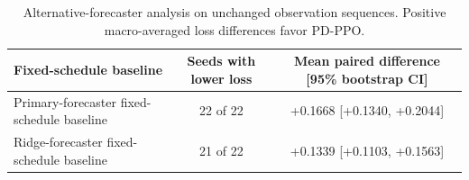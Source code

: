 \begin{table}[htbp]
  \centering
  \caption{Alternative-forecaster analysis on unchanged observation sequences. Positive macro-averaged loss differences favor PD-PPO.}
  \label{tab:clean_secondary_forecaster}
  \footnotesize
  \begin{tabular}{@{}lcc@{}}
    \toprule
    Fixed-schedule baseline & Seeds with lower loss & Mean paired difference [95\% bootstrap CI] \\
    \midrule
    Primary-forecaster fixed-schedule baseline & 22 of 22 & +0.1668 [+0.1340, +0.2044] \\
    Ridge-forecaster fixed-schedule baseline & 21 of 22 & +0.1339 [+0.1103, +0.1563] \\
    \bottomrule
  \end{tabular}
\end{table}
